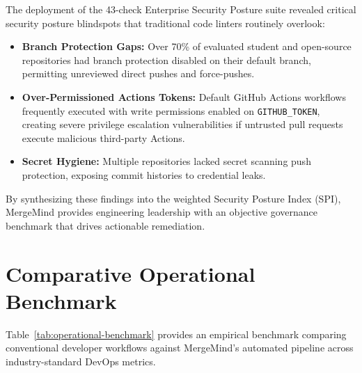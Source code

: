 \documentclass[12pt,a4paper,oneside]{report}
\begin{document}
The deployment of the 43-check Enterprise Security Posture suite revealed critical security posture blindspots that traditional code linters routinely overlook:
\begin{itemize}
    \item \textbf{Branch Protection Gaps:} Over 70\% of evaluated student and open-source repositories had branch protection disabled on their default branch, permitting unreviewed direct pushes and force-pushes.
    \item \textbf{Over-Permissioned Actions Tokens:} Default GitHub Actions workflows frequently executed with write permissions enabled on \texttt{GITHUB\_TOKEN}, creating severe privilege escalation vulnerabilities if untrusted pull requests execute malicious third-party Actions.
    \item \textbf{Secret Hygiene:} Multiple repositories lacked secret scanning push protection, exposing commit histories to credential leaks.
\end{itemize}

By synthesizing these findings into the weighted Security Posture Index (SPI), MergeMind provides engineering leadership with an objective governance benchmark that drives actionable remediation.

\section{Comparative Operational Benchmark}
\label{sec:disc-benchmark}

Table~\ref{tab:operational-benchmark} provides an empirical benchmark comparing conventional developer workflows against MergeMind's automated pipeline across industry-standard DevOps metrics.
\end{document}

